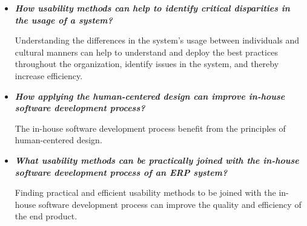 \documentclass[12pt,a4paper,oneside,pdftex]{report}
\begin{document}
\begin{itemize}
\item \textbf{\emph{How usability methods can help to identify critical disparities in the usage of a system?}}

Understanding the differences in the system's usage between individuals and cultural manners can help to understand and deploy the best practices throughout the organization, identify issues in the system, and thereby increase efficiency.

\item \textbf{\emph{How applying the human-centered design can improve in-house software development process?}}

The in-house software development process benefit from the principles of human-centered design.

\item \textbf{\emph{What usability methods can be practically joined with the in-house software development process of an ERP system?}}

Finding practical and efficient usability methods to be joined with the in-house software development process can improve the quality and efficiency of the end product.

\end{itemize}




\end{document}
